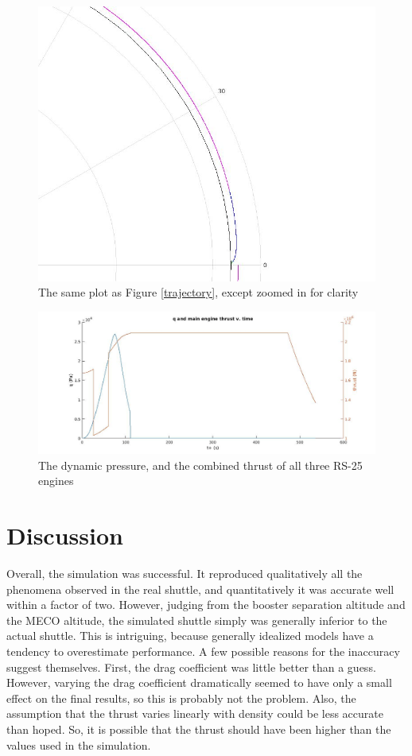 \documentclass{article}
\begin{document}
\begin{figure}
	\includegraphics[width = \linewidth]{orbit_trajectory_zoom.jpg}
	\caption{The same plot as Figure \ref{trajectory}, except zoomed in for clarity}
	\label{zoom}
\end{figure}
\begin{figure}
	\includegraphics[width = \linewidth]{q_thrust.jpg}
	\caption{The dynamic pressure, and the combined thrust of all three RS-25 engines}
	\label{q_thrust}
\end{figure}


\section{Discussion}

Overall, the simulation was successful. It reproduced qualitatively all the phenomena observed in the real shuttle, and quantitatively it
was accurate well within a factor of two. However, judging from the booster separation altitude and the MECO altitude, the simulated shuttle
simply was generally inferior to the actual shuttle. This is intriguing, because generally idealized models have a tendency to overestimate
performance. A few possible reasons for the inaccuracy suggest themselves. First, the drag coefficient was little better than a guess.
However, varying the drag coefficient dramatically seemed to have only a small effect on the final results, so this is probably not the
problem. Also, the assumption that the thrust varies linearly with density could be less accurate than hoped. So, it is possible that
the thrust should have been higher than the values used in the simulation.
\end{document}
